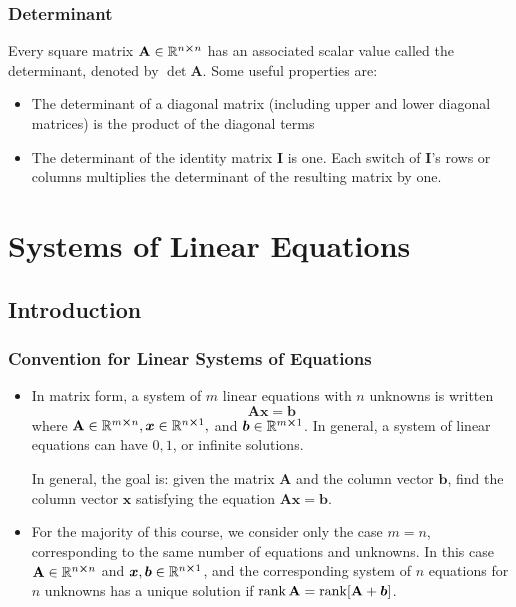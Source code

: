 \documentclass[11pt, a4paper]{article}
\newcommand{\R}{\mathbb{R}} %
\newcommand{\mat}[1]{\mathbf{#1}} %
\begin{document}
\subsubsection{Determinant}
Every square matrix $ \mat{A} \in \R^{n \cross n} $ has an associated scalar value called the determinant, denoted by $ \det \mat{A} $. Some useful properties are:
\begin{itemize}
	\item The determinant of a diagonal matrix (including upper and lower diagonal matrices) is the product of the diagonal terms
	
	\item The determinant of the identity matrix $ \mathbf{I} $ is one. Each switch of $ \mathbf{I} $'s rows or columns multiplies the determinant of the resulting matrix by one.
\end{itemize}



\section{Systems of Linear Equations}

\subsection{Introduction}

\subsubsection{Convention for Linear Systems of Equations}
\begin{itemize}
	\item In matrix form, a system of $ m $ linear equations with $ n $ unknowns is written
	\begin{equation*}
		\mat{A} \bm{x} = \bm{b}
	\end{equation*}
	where $ \mat{A} \in \R^{m \cross n}, \bm{x} \in \R^{n \cross 1}, $ and  $\bm{b} \in \R^{m \cross 1} $. In general, a system of linear equations can have $ 0, 1 $, or infinite solutions.
		
	In general, the goal is: given the matrix $ \mat{A} $ and the column vector $ \bm{b} $, find the column vector $ \bm{x} $ satisfying the equation $ \mat{A} \bm{x} = \bm{b} $.

	
	\item For the majority of this course, we consider only the case $ m = n $, corresponding to the same number of equations and unknowns. In this case $ \mat{A} \in \R^{n \cross n} $ and $ \bm{x}, \bm{b} \in \R^{n \cross 1}$, and the corresponding system of $ n $ equations for $ n $ unknowns has a unique solution if  $ \rank \mat{A} = \rank[\mat{A} + \bm{b}] $.
	
\end{itemize}
\end{document}
